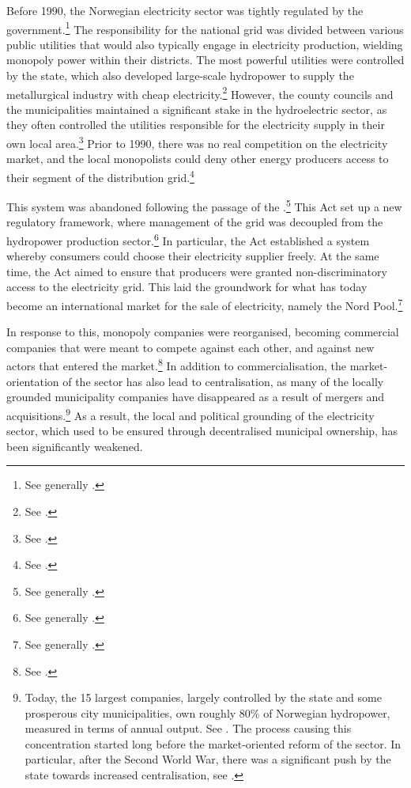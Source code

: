 Before 1990, the Norwegian electricity sector was tightly regulated by the government.\footnote{See generally \cite{bye05,skjold07}.} The responsibility for the national grid was divided between various public utilities that would also typically engage in electricity production, wielding monopoly power within their districts. The most powerful utilities were controlled by the state, which also developed large-scale hydropower to supply the metallurgical industry with cheap electricity.\footnote{See \cite[67-71]{thue96}.} However, the county councils and the municipalities maintained a significant stake in the hydroelectric sector, as they often controlled the utilities responsible for the electricity supply in their own local area.\footnote{See \cite[85]{thue96}.} 
Prior to 1990, there was no real competition on the electricity market, and the local monopolists could deny other energy producers access to their segment of the distribution grid.\footnote{See \cite[83-84]{uleberg08}.}

This system was abandoned following the passage of the \cite{ea90}.\footnote{See generally \cite{bibow11}.} This Act set up a new regulatory framework, where management of the grid was decoupled from the hydropower production sector.\footnote{See generally \cite{bye05}.} In particular, the Act established a system whereby consumers could choose their electricity supplier freely. At the same time, the Act aimed to ensure that producers were granted non-discriminatory access to the electricity grid. This laid the groundwork for what has today become an international market for the sale of electricity, namely the Nord Pool.\footnote{See generally \cite{galtung07}.}

In response to this, monopoly companies were reorganised, becoming commercial companies that were meant to compete against each other, and against new actors that entered the market.\footnote{See \cite{claes11}.} In addition to commercialisation, the market-orientation of the sector has also lead to centralisation, as many of the locally grounded municipality companies have disappeared as a result of mergers and acquisitions.\footnote{Today, the 15 largest companies, largely controlled by the state and some prosperous city municipalities, own roughly 80\% of Norwegian hydropower, measured in terms of annual output. See \cite[28]{otprp61}. The process causing this concentration started long before the market-oriented reform of the sector. In particular, after the Second World War, there was a significant push by the state towards increased centralisation, see \cite{skjold06,thue06b}.} As a result, the local and political grounding of the electricity sector, which used to be ensured through decentralised municipal ownership, has been significantly weakened.

